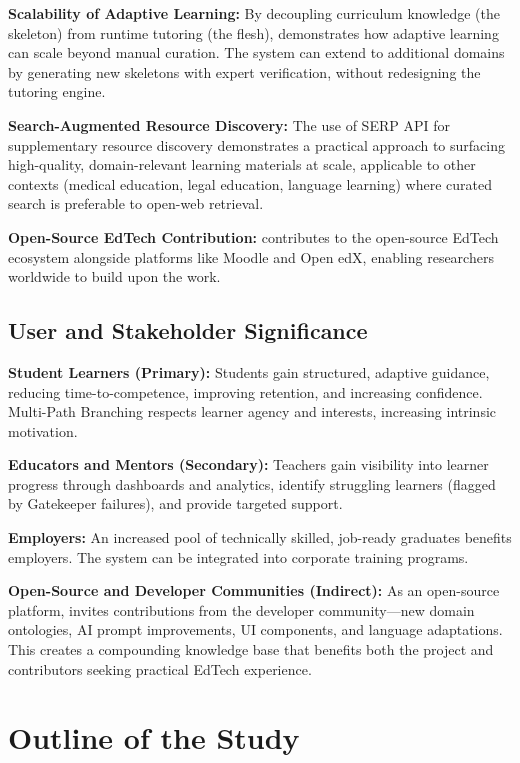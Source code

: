 \textbf{Scalability of Adaptive Learning:} By decoupling curriculum knowledge (the skeleton) from runtime tutoring (the flesh), \projectname{} demonstrates how adaptive learning can scale beyond manual curation. The system can extend to additional domains by generating new skeletons with expert verification, without redesigning the tutoring engine.

\textbf{Search-Augmented Resource Discovery:} The use of SERP API for supplementary resource discovery demonstrates a practical approach to surfacing high-quality, domain-relevant learning materials at scale, applicable to other contexts (medical education, legal education, language learning) where curated search is preferable to open-web retrieval.

\textbf{Open-Source EdTech Contribution:} \projectname{} contributes to the open-source EdTech ecosystem alongside platforms like Moodle and Open edX, enabling researchers worldwide to build upon the work.

\subsection{User and Stakeholder Significance}

\textbf{Student Learners (Primary):} Students gain structured, adaptive guidance, reducing time-to-competence, improving retention, and increasing confidence. Multi-Path Branching respects learner agency and interests, increasing intrinsic motivation.

\textbf{Educators and Mentors (Secondary):} Teachers gain visibility into learner progress through dashboards and analytics, identify struggling learners (flagged by Gatekeeper failures), and provide targeted support.

\textbf{Employers:} An increased pool of technically skilled, job-ready graduates benefits employers. The system can be integrated into corporate training programs.

\textbf{Open-Source and Developer Communities (Indirect):} As an open-source platform, \projectname{} invites contributions from the developer community---new domain ontologies, AI prompt improvements, UI components, and language adaptations. This creates a compounding knowledge base that benefits both the project and contributors seeking practical EdTech experience.

\section{Outline of the Study}
\label{sec:outline}

